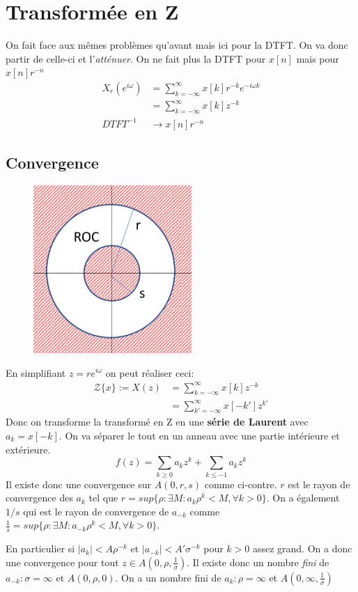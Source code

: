 \documentclass{report}
\begin{document}
\section{Transformée en Z}
On fait face aux mêmes problèmes qu'avant mais ici pour la DTFT. On va donc partir de celle-ci et l'\textit{atténuer}. On ne fait plus la DTFT pour $x[n]$ mais pour $x[n]r^{-n}$
\begin{align*}
X_r(e^{i \omega}) &= \sum_{k = - \infty}^{\infty} x[k] r^{-k} e^{-i \omega k}\\
& = \sum_{k = - \infty}^{\infty} x[k] z^{-k}\\
DTFT^{-1} & \rightarrow x[n] r^{-n}
\end{align*}

\subsection{Convergence}
\begin{figure}
\centering
\includegraphics[width=6cm]{img/ROCLaurent.png}
\end{figure}
En simplifiant $z = r e^{i \omega}$ on peut réaliser ceci:
\begin{align*}
\mathcal{Z}\{x\} := X(z) &= \sum_{k = - \infty}^{\infty} x[k] z^{-k} \\
& = \sum_{k' = - \infty}^{\infty} x[-k'] z^{k'}
\end{align*}
Donc on transforme la transformé en Z en une \textbf{série de Laurent} avec $a_k = x[-k]$. On va séparer le tout en un anneau avec une partie intérieure et extérieure.
\begin{equation}
f(z) = \sum_{k \geqslant 0} a_k z^k + \sum_{k \leqslant -1} a_k z^k
\end{equation}
Il existe donc une convergence sur $A(0,r,s)$ comme ci-contre. $r$ est le rayon de convergence des $a_k$ tel que $r = sup\{\rho : \exists M: a_k \rho^k < M, \forall k > 0 \}$. On a également $1/s$ qui est le rayon de convergence de $a_{-k}$ comme $\frac{1}{s} = sup\{\rho : \exists M : a_{-k} \rho^k < M, \forall k > 0 \}$.\par
En particulier si $|a_k| < A \rho^{-k}$ et $|a_{-k}| < A' \sigma^{-k}$ pour $k > 0$ assez grand. On a donc une convergence pour tout $z \in A \left( 0, \rho, \frac{1}{\sigma} \right)$. Il existe donc un nombre \textit{fini} de $a_{-k} : \sigma = \infty$ et $A(0, \rho, 0)$. On a un nombre fini de $a_k : \rho = \infty$ et $A\left( 0, \infty , \frac{1}{\sigma} \right)$\\
\end{document}
